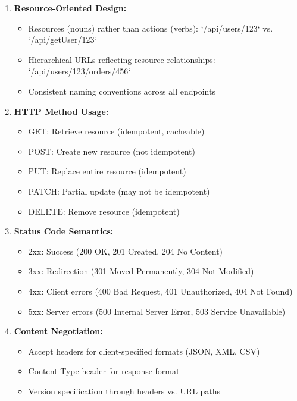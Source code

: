 \documentclass[conference]{IEEEtran}
\begin{document}
\begin{enumerate}
    \item \textbf{Resource-Oriented Design:}
    \begin{itemize}
        \item Resources (nouns) rather than actions (verbs): `/api/users/123` vs. `/api/getUser/123`
        \item Hierarchical URLs reflecting resource relationships: `/api/users/123/orders/456`
        \item Consistent naming conventions across all endpoints
    \end{itemize}
    
    \item \textbf{HTTP Method Usage:}
    \begin{itemize}
        \item GET: Retrieve resource (idempotent, cacheable)
        \item POST: Create new resource (not idempotent)
        \item PUT: Replace entire resource (idempotent)
        \item PATCH: Partial update (may not be idempotent)
        \item DELETE: Remove resource (idempotent)
    \end{itemize}
    
    \item \textbf{Status Code Semantics:}
    \begin{itemize}
        \item 2xx: Success (200 OK, 201 Created, 204 No Content)
        \item 3xx: Redirection (301 Moved Permanently, 304 Not Modified)
        \item 4xx: Client errors (400 Bad Request, 401 Unauthorized, 404 Not Found)
        \item 5xx: Server errors (500 Internal Server Error, 503 Service Unavailable)
    \end{itemize}
    
    \item \textbf{Content Negotiation:}
    \begin{itemize}
        \item Accept headers for client-specified formats (JSON, XML, CSV)
        \item Content-Type header for response format
        \item Version specification through headers vs. URL paths
    \end{itemize}
\end{enumerate}
\end{document}
